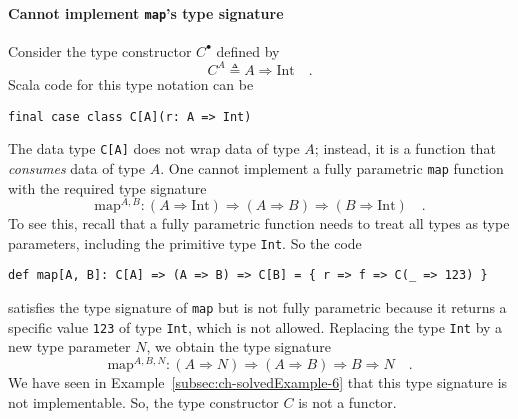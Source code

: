 \paragraph{Cannot implement \lstinline!map!'s type signature}

Consider the type constructor $C^{\bullet}$ defined by
\[
C^{A}\triangleq A\Rightarrow\text{Int}\quad.
\]
Scala code for this type notation can be
\begin{lstlisting}
final case class C[A](r: A => Int)
\end{lstlisting}
The data type \lstinline!C[A]! does not wrap data of type $A$; instead,
it is a function that \emph{consumes} data of type $A$. One cannot
implement a fully parametric \lstinline!map! function with the required
type signature 
\[
\text{map}^{A,B}:\left(A\Rightarrow\text{Int}\right)\Rightarrow\left(A\Rightarrow B\right)\Rightarrow\left(B\Rightarrow\text{Int}\right)\quad.
\]
To see this, recall that a fully
parametric function needs to treat all types as type parameters, including
the primitive type \lstinline!Int!. So the code
\begin{lstlisting}
def map[A, B]: C[A] => (A => B) => C[B] = { r => f => C(_ => 123) }
\end{lstlisting}
satisfies the type signature of \lstinline!map! but is not fully
parametric because it returns a specific value \lstinline!123! of
type \lstinline!Int!, which is not allowed. Replacing the type \lstinline!Int!
by a new type parameter $N$, we obtain the type signature
\[
\text{map}^{A,B,N}:\left(A\Rightarrow N\right)\Rightarrow\left(A\Rightarrow B\right)\Rightarrow B\Rightarrow N\quad.
\]
We have seen in Example~\ref{subsec:ch-solvedExample-6} that this
type signature is not implementable. So, the type constructor $C$
is not a functor.

